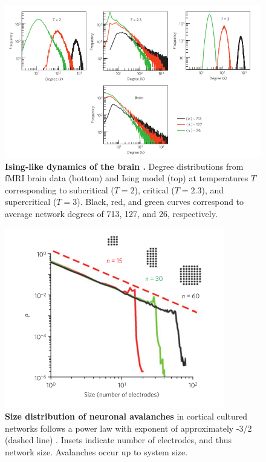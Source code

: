 \documentclass[12pt]{article}
\begin{document}
\begin{figure}      
  \begin{center}    
 \includegraphics[width=.8\textwidth]{isinglikedynamicschialvo}    
    \caption{\textbf{Ising-like dynamics of the brain \cite{Fraiman2009a}.} Degree distributions from fMRI brain data (bottom) and Ising model (top) at temperatures $T$ corresponding to subcritical ($T=2$), critical ($T=2.3$), and supercritical ($T=3$). Black, red, and green curves correspond to average network degrees of 713, 127, and 26, respectively.}
   \label{Figure::Ising model and the brain at criticality}   
  \end{center}     
   \end{figure}
   
\begin{figure}      
  \begin{center}    
 \includegraphics[width=.6\textwidth]{originalavalancheplenz}    
    \caption{\textbf{Size distribution of neuronal avalanches} in cortical cultured networks follows a power law with exponent of approximately -3/2 (dashed line) \cite{Beggs2003b}. Insets indicate number of electrodes, and thus network size. Avalanches occur up to system size.}
   \label{Figure::Neuronal Avalanches}   
  \end{center}     
   \end{figure}
   
\end{document}
